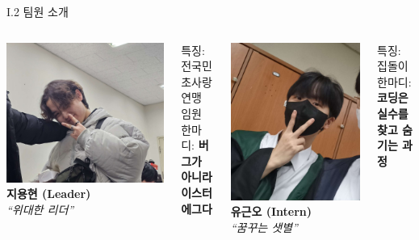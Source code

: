 \documentclass{beamer}
\begin{document}
\begin{frame}{I.2 팀원 소개}
	\begin{columns}[T,onlytextwidth]
		\centering
		\includegraphics[width=.5\linewidth,height=.35\textheight]{ji.jpg}\\
		\textbf{지용현 (Leader)}\\
		\textit{``위대한 리더''}\\
		\begin{flushleft}\footnotesize
			특징: 전국민초사랑연맹 임원\\
			한마디: \textbf{버그가 아니라 이스터에그다}
		\end{flushleft}
		
		\centering
		\includegraphics[width=.5\linewidth,height=.35\textheight]{yoo.jpg}\\
		\textbf{유근오 (Intern)}\\
		\textit{``꿈꾸는 샛별''}\\
		\begin{flushleft}\footnotesize
			특징: 집돌이\\
			한마디: \textbf{코딩은 실수를 찾고 숨기는 과정}
		\end{flushleft}
	\end{columns}
\end{frame}
\end{document}
